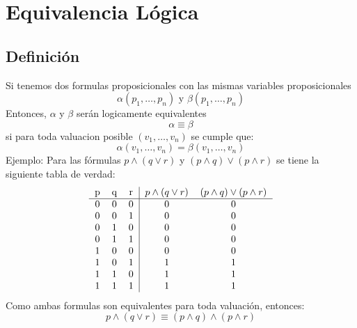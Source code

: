 \documentclass{article}
\begin{document}
\section{Equivalencia Lógica}
\subsection{Definición}
Si tenemos dos formulas proposicionales con las mismas variables proposicionales
$$\alpha{}(p_{1},\ldots{},p_{n}) \text{ y } \beta{}(p_{1},\ldots{},p_{n})$$
Entonces, $\alpha$ y $\beta$ serán logicamente equivalentes
$$\alpha \equiv \beta$$
si para toda valuacion posible $(v_{1}, \ldots{},v_{n})$ se cumple que:
$$\alpha{}(v_{1}, \ldots{},v_{n}) = \beta{}(v_{1}, \ldots{},v_{n})$$
Ejemplo:
Para las fórmulas $p \wedge (q \vee r)$ y $(p \wedge q) \vee (p \wedge r)$ se tiene la siguiente tabla de verdad:
\[
    \begin{tabular}{ccc|cc}
        p & q & r & $p \wedge (q \vee r)$ & $(p \wedge q) \vee (p \wedge r)$ \\ \hline
        0 & 0 & 0 & 0 & 0\\
        0 & 0 & 1 & 0 & 0\\
        0 & 1 & 0 & 0 & 0\\
        0 & 1 & 1 & 0 & 0\\
        1 & 0 & 0 & 0 & 0\\
        1 & 0 & 1 & 1 & 1\\
        1 & 1 & 0 & 1 & 1\\
        1 & 1 & 1 & 1 & 1
    \end{tabular}
\]
Como ambas formulas son equivalentes para toda valuación, entonces:
$$p \wedge (q \vee r) \equiv (p \wedge q) \wedge (p \wedge r)$$
\end{document}
